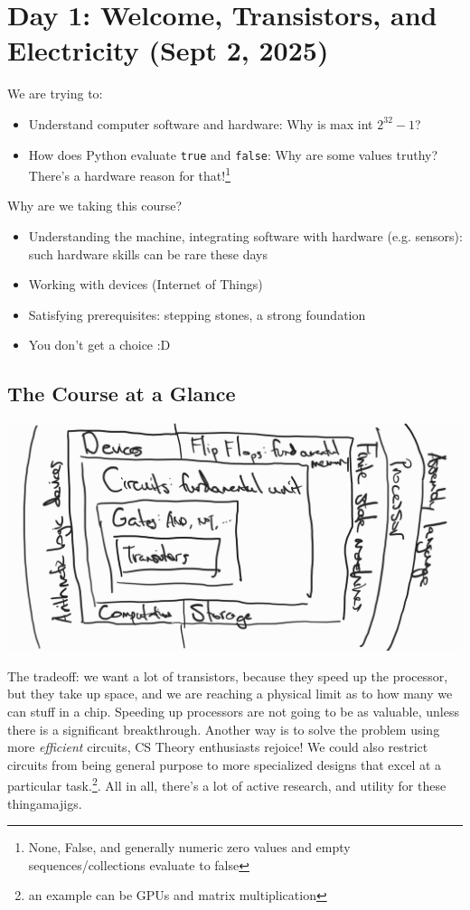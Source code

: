 \section{Day 1: Welcome, Transistors, and Electricity (Sept 2, 2025)}

We are trying to:
\begin{itemize}
    \item Understand computer software and hardware: Why is max int $2^{32} - 1$?
    \item How does Python evaluate \texttt{true} and \texttt{false}: Why are some values truthy? There's a hardware reason for that!\footnote{None, False, and generally numeric zero values and empty sequences/collections evaluate to false}
\end{itemize}

\noindent Why are we taking this course?
\begin{itemize}
    \item Understanding the machine, integrating software with hardware (e.g. sensors): such hardware skills can be rare these days
    \item Working with devices (Internet of Things)
    \item Satisfying prerequisites: stepping stones, a strong foundation
    \item You don't get a choice :D
\end{itemize}

\subsection{The Course at a Glance}
\includegraphics{csc258/figures/courseataglance.jpg}

\begin{remark}
    The tradeoff: we want a lot of transistors, because they speed up the processor, but they take up space, and we are reaching a physical limit as to how many we can stuff in a chip. Speeding up processors are not going to be as valuable, unless there is a significant breakthrough. Another way is to solve the problem using more \textit{efficient} circuits, CS Theory enthusiasts rejoice! We could also restrict circuits from being general purpose to more specialized designs that excel at a particular task.\footnote{an example can be GPUs and matrix multiplication}. All in all, there's a lot of active research, and utility for these thingamajigs.
\end{remark}

